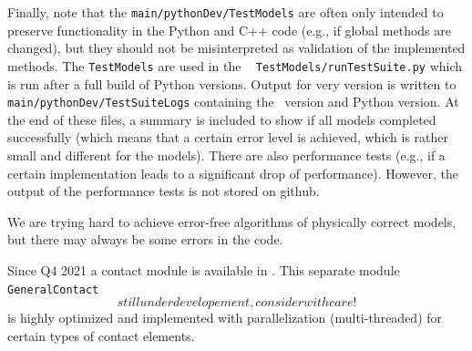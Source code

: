 Finally, note that the \texttt{main/pythonDev/TestModels} are often only intended to preserve functionality
in the Python and C++ code (e.g., if global methods are changed), but they should not be misinterpreted as validation of the 
implemented methods. The \texttt{TestModels} are used in the \codeName\  \texttt{TestModels/runTestSuite.py}
which is run after a full build of Python versions. Output for very version is written
to \texttt{main/pythonDev/TestSuiteLogs} containing the \codeName\ version and Python version. At the end of these
files, a summary is included to show if all models completed successfully (which means that a certain error level is achieved, which is rather small and different for the models).
There are also performance tests (e.g., if a certain implementation leads to a significant drop of performance).
However, the output of the performance tests is not stored on github.

We are trying hard to achieve error-free algorithms of physically correct models, but there may always be some errors in the code.

%
Since Q4 2021 a contact module is available in \codeName. 
This separate module \texttt{GeneralContact} \[still under developement, consider with care!\] is highly optimized and implemented with parallelization (multi-threaded) for certain types of contact elements.

